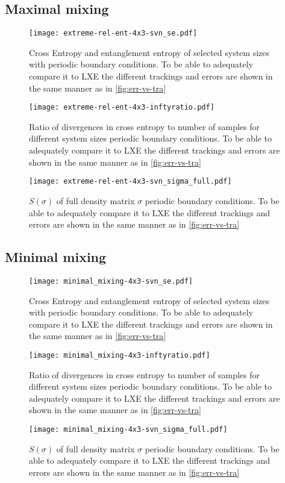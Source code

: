 \subsection{Maximal mixing}
\begin{figure}[H]
  \centering
  \texttt{[image: extreme-rel-ent-4x3-svn\_se.pdf]}
  \caption{Cross Entropy and entanglement entropy of selected system sizes with
  periodic boundary conditions. To be able to adequately compare it to LXE the
different trackings and errors are shown in the same manner as in
\cref{fig:err-vs-tra}}
  \label{fig:max_mix-svn_se-4x3}
\end{figure}
\begin{figure}[H]
  \centering
  \texttt{[image: extreme-rel-ent-4x3-inftyratio.pdf]}
  \caption{Ratio of divergences in cross entropy to number of samples for
    different system sizes
  periodic boundary conditions. To be able to adequately compare it to LXE the
different trackings and errors are shown in the same manner as in
\cref{fig:err-vs-tra}}
  \label{fig:max_mix-inftyratio-4x3}
\end{figure}
\begin{figure}[H]
  \centering
  \texttt{[image: extreme-rel-ent-4x3-svn\_sigma\_full.pdf]}
  \caption{$S(\sigma)$ of full density matrix $\sigma$ 
  periodic boundary conditions. To be able to adequately compare it to LXE the
different trackings and errors are shown in the same manner as in
\cref{fig:err-vs-tra}}
  \label{fig:max_mix-svn_sigma_full-4x3}
\end{figure}
\subsection{Minimal mixing}
\begin{figure}[H]
  \centering
  \texttt{[image: minimal\_mixing-4x3-svn\_se.pdf]}
  \caption{Cross Entropy and entanglement entropy of selected system sizes with
  periodic boundary conditions. To be able to adequately compare it to LXE the
different trackings and errors are shown in the same manner as in
\cref{fig:err-vs-tra}}
  \label{fig:min_mix-svn_se-4x3}
\end{figure}
\begin{figure}[H]
  \centering
  \texttt{[image: minimal\_mixing-4x3-inftyratio.pdf]}
  \caption{Ratio of divergences in cross entropy to number of samples for
    different system sizes
  periodic boundary conditions. To be able to adequately compare it to LXE the
different trackings and errors are shown in the same manner as in
\cref{fig:err-vs-tra}}
  \label{fig:min_mix-inftyratio-4x3}
\end{figure}
\begin{figure}[H]
  \centering
  \texttt{[image: minimal\_mixing-4x3-svn\_sigma\_full.pdf]}
  \caption{$S(\sigma)$ of full density matrix $\sigma$ 
  periodic boundary conditions. To be able to adequately compare it to LXE the
different trackings and errors are shown in the same manner as in
\cref{fig:err-vs-tra}}
  \label{fig:min_mix-svn_sigma_full-4x3}
\end{figure}
